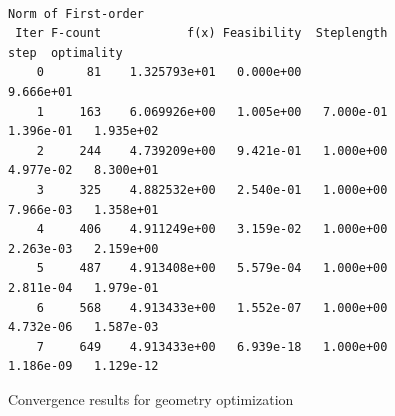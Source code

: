 \documentclass[11pt]{article}
\begin{document}
\begin{figure}[hbt]
\small
\centering
\begin{verbatim}
                                                         Norm of First-order
 Iter F-count            f(x) Feasibility  Steplength        step  optimality
    0      81    1.325793e+01   0.000e+00                           9.666e+01
    1     163    6.069926e+00   1.005e+00   7.000e-01   1.396e-01   1.935e+02
    2     244    4.739209e+00   9.421e-01   1.000e+00   4.977e-02   8.300e+01
    3     325    4.882532e+00   2.540e-01   1.000e+00   7.966e-03   1.358e+01
    4     406    4.911249e+00   3.159e-02   1.000e+00   2.263e-03   2.159e+00
    5     487    4.913408e+00   5.579e-04   1.000e+00   2.811e-04   1.979e-01
    6     568    4.913433e+00   1.552e-07   1.000e+00   4.732e-06   1.587e-03
    7     649    4.913433e+00   6.939e-18   1.000e+00   1.186e-09   1.129e-12
\end{verbatim}
\caption{Convergence results for geometry optimization}
\label{fig:convergence}
\end{figure}
\end{document}
